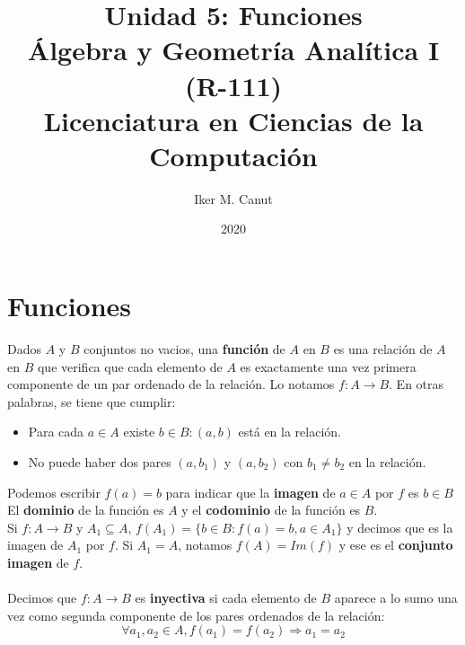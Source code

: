 \documentclass[11pt,a4paper]{article}
\author{Iker M. Canut}
\title{Unidad 5: Funciones\\\'Algebra y Geometr\'ia Anal\'itica I (R-111)\\Licenciatura en Ciencias de la Computaci\'on}
\date{2020}
\begin{document}
\maketitle
\newpage

\section{Funciones}
\noindent Dados $A$ y $B$ conjuntos no vacios, una \textbf{funci\'on} de $A$ en $B$ es una relaci\'on de $A$ en $B$ que verifica que cada elemento de $A$ es exactamente una vez primera componente de un par ordenado de la relaci\'on. Lo notamos $f : A \rightarrow B$. En otras palabras, se tiene que cumplir:
\begin{itemize}
\item Para cada $a \in A$ existe $b \in B : (a,b)$ est\'a en la relaci\'on.
\item No puede haber dos pares $(a, b_1)$ y $(a,b_2)$ con $b_1 \not = b_2$ en la relaci\'on.
\end{itemize}
\noindent Podemos escribir $f(a) = b$ para indicar que la \textbf{imagen} de $a\in A$ por $f$ es $b\in B$\\
\noindent El \textbf{dominio} de la funci\'on es $A$ y el \textbf{codominio} de la funci\'on es $B$.\\
\noindent Si $f : A \rightarrow B$ y $A_1 \subseteq A$,
$f(A_1) = \{ b \in B : f(a) = b, a \in A_1 \}$
y decimos que es la imagen de $A_1$ por $f$. Si $A_1 = A$, notamos $f(A) = Im(f)$ y ese es el \textbf{conjunto imagen} de $f$.\\ \\


\noindent Decimos que $f : A \rightarrow B$ es \textbf{inyectiva} si cada elemento de $B$ aparece a lo sumo una vez como segunda componente de los pares ordenados de la relaci\'on: $$\forall a_1, a_2 \in A, f(a_1) = f(a_2) \Rightarrow a_1 = a_2$$
\end{document}
